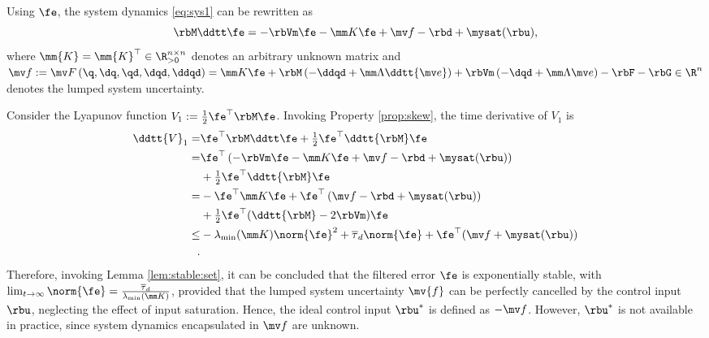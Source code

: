 \documentclass[journal]{IEEEtran}
\begin{document}
Using $\fe$, the system dynamics \eqref{eq:sys1} can be rewritten as
\begin{equation}
   \rbM \ddtt\fe
    =
    -\rbVm \fe
    -\mm K \fe
    + \mv f
    -\rbd + \mysat(\rbu)
    ,
    \label{eq:sys:filtered}
\end{equation}
where $\mm{K}=\mm{K}^\top\in\R^{n\times n}_{>0}$ denotes an arbitrary unknown matrix and $
    \mv f:= \mv F
    \left(
        \q,\dq,\qd,\dqd,\ddqd
    \right)
    =
    \mm K \fe
    +\rbM
    \left(
        -\ddqd+\mm\Lambda\ddtt{\mv e}
    \right)
    +
    \rbVm
    \left(
        -\dqd+\mm\Lambda\mv e
    \right)
    -
    \rbF
    -
    \rbG
    \in\R^n
$ denotes the lumped system uncertainty.

Consider the Lyapunov function $V_1:= \tfrac{1}{2}\fe^\top \rbM\fe$. 
Invoking Property \ref{prop:skew}, the time derivative of $V_1$ is
\begin{equation}
    \begin{aligned}
        \ddtt{V}_1
        =&
        \fe^\top \rbM \ddtt \fe
        +
        \tfrac{1}{2}\fe^\top \ddtt{\rbM}\fe
        \\
        =&
        \fe^\top 
        \left(
            -\rbVm \fe -\mm K \fe + \mv f
            -\rbd + \mysat(\rbu)
        \right)
        \\
        &
        +
        \tfrac{1}{2}
        \fe^\top \ddtt{\rbM}\fe
        \\
        =&
        -
        \fe^\top \mm K \fe 
        +
        \fe^\top 
        \left(
            \mv f
            -\rbd
            +\mysat(\rbu)
        \right)
        \\
        &
        +
        \tfrac{1}{2}
        \fe^\top(\ddtt{\rbM}- 2\rbVm)\fe
        \\
        \le&
        -\lambda_{\min}(\mm K)\norm{\fe}^2
        +
        \overline\tau_d\norm{\fe}
        +
        \fe^\top (\mv f+\mysat(\rbu))\\
        .
    \end{aligned}
    \label{eq:lya1:dot1}
\end{equation} 
Therefore, invoking Lemma \ref{lem:stable:set}, it can be concluded that the filtered error $\fe$ is exponentially stable, with $\lim_{t\to\infty}\norm{\fe}=\tfrac{\overline\tau_d}{\lambda_{\min}(\mm K)}$, provided that the lumped system uncertainty $\mv{f}$ can be perfectly cancelled by the control input $\rbu$, neglecting the effect of input saturation.
Hence, the ideal control input $\rbu^*$ is defined as $-\mv f$.
However, $\rbu^*$ is not available in practice, since system dynamics encapsulated in $\mv f$ are unknown.
\end{document}
